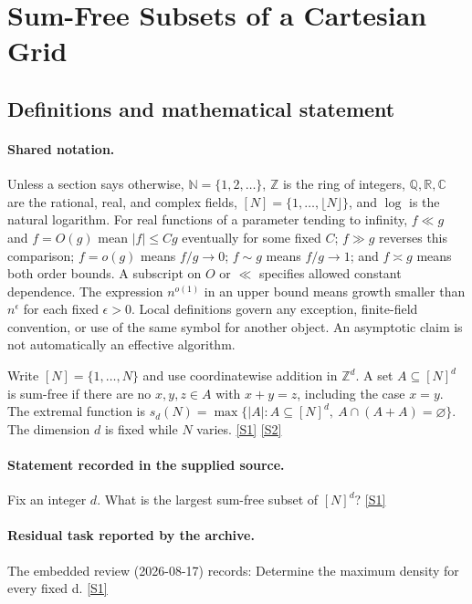 \documentclass[11pt,a4paper]{article}
\newcommand{\N}{\mathbb{N}}
\newcommand{\Z}{\mathbb{Z}}
\newcommand{\Q}{\mathbb{Q}}
\newcommand{\R}{\mathbb{R}}
\newcommand{\C}{\mathbb{C}}
\newcommand{\sref}[2]{\hyperlink{source:#1:#2}{[S#2]}}
\begin{document}
\section{Sum-Free Subsets of a Cartesian Grid}\label{statement}


\subsection{Definitions and mathematical statement}

\paragraph{Shared notation.}Unless a section says otherwise, $\N=\{1,2,\ldots\}$,
$\Z$ is the ring of integers, $\Q,\R,\C$ are the rational, real, and complex
fields, $[N]=\{1,\ldots,\lfloor N\rfloor\}$, and $\log$ is the natural
logarithm. For real functions of a parameter tending to infinity,
$f\ll g$ and $f=O(g)$ mean $|f|\leq Cg$ eventually for some fixed $C$;
$f\gg g$ reverses this comparison; $f=o(g)$ means $f/g\to0$;
$f\sim g$ means $f/g\to1$; and $f\asymp g$ means both order bounds.
A subscript on $O$ or $\ll$ specifies allowed constant dependence.
The expression $n^{o(1)}$ in an upper bound means growth smaller than
$n^\epsilon$ for each fixed $\epsilon>0$. Local definitions govern any
exception, finite-field convention, or use of the same symbol for another
object. An asymptotic claim is not automatically an effective algorithm.



Write $[N]=\{1,\ldots,N\}$ and use coordinatewise addition in $\Z^d$. A set $A\subseteq[N]^d$ is sum-free if there are no $x,y,z\in A$ with $x+y=z$, including the case $x=y$. The extremal function is $s_d(N)=\max\{|A|:A\subseteq[N]^d,\ A\cap(A+A)=\varnothing\}$. The dimension $d$ is fixed while $N$ varies. \sref{statement}{1} \sref{statement}{2}

\paragraph{Statement recorded in the supplied source.}
Fix an integer $d$. What is the largest sum-free subset of $[N]^d$? \sref{statement}{1}

\paragraph{Residual task reported by the archive.}

The embedded review (2026-08-17) records: Determine the maximum density for every fixed d. \sref{statement}{1}
\end{document}
